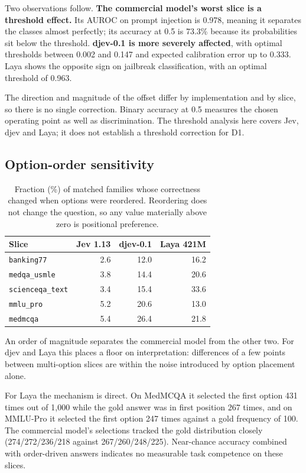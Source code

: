 Two observations follow. \textbf{The commercial model's worst slice is a threshold effect.} Its AUROC on prompt injection is 0.978, meaning it separates the classes almost perfectly; its accuracy at 0.5 is 73.3\% because its probabilities sit below the threshold. \textbf{djev-0.1 is more severely affected}, with optimal thresholds between 0.002 and 0.147 and expected calibration error up to 0.333. Laya shows the opposite sign on jailbreak classification, with an optimal threshold of 0.963.

The direction and magnitude of the offset differ by implementation and by slice, so there is no single correction. Binary accuracy at 0.5 measures the chosen operating point as well as discrimination. The threshold analysis here covers Jev, djev and Laya; it does not establish a threshold correction for D1.

\subsection{Option-order sensitivity}
\label{sec:position}

\begin{table}[t]
\centering
\caption{Fraction (\%) of matched families whose correctness changed when options were reordered. Reordering does not change the question, so any value materially above zero is positional preference.}
\label{tab:position}
\small
\begin{tabular}{lrrr}
\toprule
Slice & Jev 1.13 & djev-0.1 & Laya 421M \\
\midrule
\texttt{banking77}       & 2.6 & 12.0 & 16.2 \\
\texttt{medqa\_usmle}    & 3.8 & 14.4 & 20.6 \\
\texttt{scienceqa\_text} & 3.4 & 15.4 & 33.6 \\
\texttt{mmlu\_pro}       & 5.2 & 20.6 & 13.0 \\
\texttt{medmcqa}         & 5.4 & 26.4 & 21.8 \\
\bottomrule
\end{tabular}
\end{table}

An order of magnitude separates the commercial model from the other two. For djev and Laya this places a floor on interpretation: differences of a few points between multi-option slices are within the noise introduced by option placement alone.

For Laya the mechanism is direct. On MedMCQA it selected the first option 431 times out of 1{,}000 while the gold answer was in first position 267 times, and on MMLU-Pro it selected the first option 247 times against a gold frequency of 100. The commercial model's selections tracked the gold distribution closely (274/272/236/218 against 267/260/248/225). Near-chance accuracy combined with order-driven answers indicates no measurable task competence on these slices.


